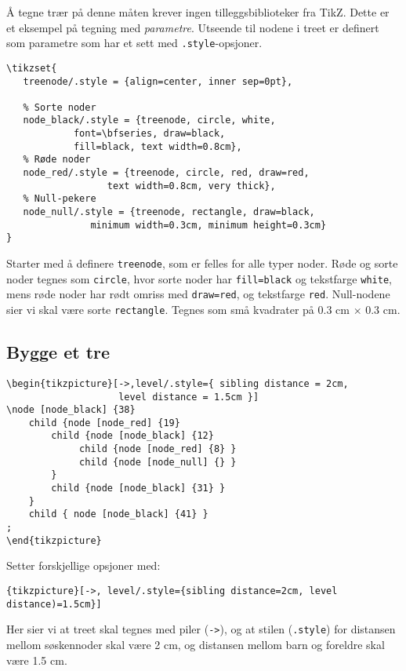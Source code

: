 \documentclass[12pt, a4paper]{article}
\begin{document}
Å tegne trær på denne måten krever ingen tilleggsbiblioteker fra TikZ. Dette er et eksempel på tegning med \textit{parametre}. Utseende til nodene i treet er definert som parametre som har et sett med \texttt{.style}-opsjoner.
\begin{Verbatim}[fontsize=\small, frame=single]
\tikzset{
   treenode/.style = {align=center, inner sep=0pt},
	
   % Sorte noder
   node_black/.style = {treenode, circle, white, 
			font=\bfseries, draw=black,
			fill=black, text width=0.8cm},
   % Røde noder
   node_red/.style = {treenode, circle, red, draw=red, 
	              text width=0.8cm, very thick},
   % Null-pekere
   node_null/.style = {treenode, rectangle, draw=black, 
		       minimum width=0.3cm, minimum height=0.3cm}
}
\end{Verbatim}
Starter med å definere \texttt{treenode}, som er felles for alle typer noder. Røde og sorte noder tegnes som \texttt{circle}, hvor sorte noder har \texttt{fill=black} og tekstfarge \texttt{white}, mens røde noder har rødt omriss med \texttt{draw=red}, og tekstfarge \texttt{red}. Null-nodene sier vi skal være sorte \texttt{rectangle}. Tegnes som små kvadrater på 0.3 cm $\times$ 0.3 cm.

\newpage
\subsection*{Bygge et tre}
\begin{Verbatim}[fontsize=\small, frame=single]
\begin{tikzpicture}[->,level/.style={ sibling distance = 2cm, 
                    level distance = 1.5cm }] 
\node [node_black] {38}
    child {node [node_red] {19} 
        child {node [node_black] {12}
             child {node [node_red] {8} }
             child {node [node_null] {} }
        }
        child {node [node_black] {31} }
    }
    child { node [node_black] {41} }
; 
\end{tikzpicture}
\end{Verbatim}

Setter forskjellige opsjoner med:
\begin{center}
\texttt{\{tikzpicture\}[->, level/.style=\{sibling distance=2cm, level distance)=1.5cm\}]}
\end{center}
Her sier vi at treet skal tegnes med piler (\texttt{->}), og at stilen (\texttt{.style}) for distansen mellom søskennoder skal være 2 cm, og distansen mellom barn og foreldre skal være 1.5 cm.
\end{document}
